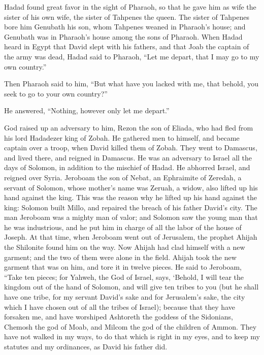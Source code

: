 {Hadad found great favor in the sight of Pharaoh, so that he gave him as wife the sister of his own wife, the sister of Tahpenes the queen.
The sister of Tahpenes bore him Genubath his son, whom Tahpenes weaned in Pharaoh’s house; and Genubath was in Pharaoh’s house among the sons of Pharaoh.
When Hadad heard in Egypt that David slept with his fathers, and that Joab the captain of the army was dead, Hadad said to Pharaoh, “Let me depart, that I may go to my own country.”
\par }{\PP {}Then Pharaoh said to him, “But what have you lacked with me, that behold, you seek to go to your own country?”
\par }{\PP He answered, “Nothing, however only let me depart.”
\par }{\PP {}God raised up an adversary to him, Rezon the son of Eliada, who had fled from his lord Hadadezer king of Zobah.
He gathered men to himself, and became captain over a troop, when David killed them of Zobah. They went to Damascus, and lived there, and reigned in Damascus.
He was an adversary to Israel all the days of Solomon, in addition to the mischief of Hadad. He abhorred Israel, and reigned over Syria.
Jeroboam the son of Nebat, an Ephraimite of Zeredah, a servant of Solomon, whose mother’s name was Zeruah, a widow, also lifted up his hand against the king.
This was the reason why he lifted up his hand against the king: Solomon built Millo, and repaired the breach of his father David’s city.
The man Jeroboam was a mighty man of valor; and Solomon saw the young man that he was industrious, and he put him in charge of all the labor of the house of Joseph.
At that time, when Jeroboam went out of Jerusalem, the prophet Ahijah the Shilonite found him on the way. Now Ahijah had clad himself with a new garment; and the two of them were alone in the field.
Ahijah took the new garment that was on him, and tore it in twelve pieces.
He said to Jeroboam, “Take ten pieces; for Yahweh, the God of Israel, says, ‘Behold, I will tear the kingdom out of the hand of Solomon, and will give ten tribes to you
(but he shall have one tribe, for my servant David’s sake and for Jerusalem’s sake, the city which I have chosen out of all the tribes of Israel);
because that they have forsaken me, and have worshiped Ashtoreth the goddess of the Sidonians, Chemosh the god of Moab, and Milcom the god of the children of Ammon. They have not walked in my ways, to do that which is right in my eyes, and to keep my statutes and my ordinances, as David his father did.
}
